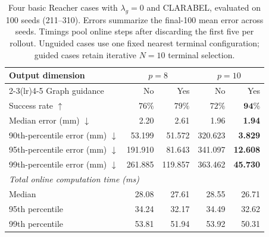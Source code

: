 \documentclass[10pt]{article}
\begin{document}
\begin{table}[htbp]
\centering
\small
\begin{tabular}{lrrrr}
\toprule
Output dimension & \multicolumn{2}{c}{$p=8$} & \multicolumn{2}{c}{$p=10$} \\
\cmidrule(lr){2-3}\cmidrule(lr){4-5}
Graph guidance & No & Yes & No & Yes \\
\midrule
Success rate $\uparrow$ & $76\%$ & $79\%$ & $72\%$ & $\mathbf{94\%}$ \\
Median error (mm) $\downarrow$ & 2.20 & 2.61 & 1.96 & \textbf{1.94} \\
90th-percentile error (mm) $\downarrow$ & 53.199 & 51.572 & 320.623 & \textbf{3.829} \\
95th-percentile error (mm) $\downarrow$ & 191.910 & 81.643 & 341.097 & \textbf{12.608} \\
99th-percentile error (mm) $\downarrow$ & 261.885 & 119.857 & 363.462 & \textbf{45.730} \\
\midrule
\multicolumn{5}{l}{\textit{Total online computation time (ms)}} \\
Median & 28.08 & 27.61 & 28.55 & 26.71 \\
95th percentile & 34.24 & 32.17 & 34.49 & 32.62 \\
99th percentile & 53.81 & 51.94 & 53.92 & 50.31 \\
\bottomrule
\end{tabular}
\caption{Four basic Reacher cases with $\lambda_g=0$ and CLARABEL, evaluated on 100 seeds (211--310). Errors summarize the final-100 mean error across seeds. Timings pool online steps after discarding the first five per rollout. Unguided cases use one fixed nearest terminal configuration; guided cases retain iterative $N=10$ terminal selection.}
\label{tab:basic-cases-clarabel-lamg0}
\end{table}
\end{document}
